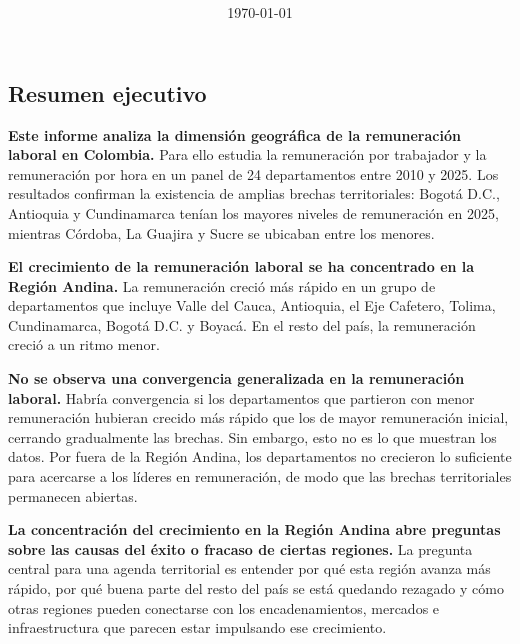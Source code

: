 \documentclass[12pt, a4paper]{article}
\title{\reporttitle\\\reportsubtitle}
\author{\reportauthorone \and \reportauthortwo}
\date{\today}
\begin{document}


\begin{mdframed}[
  linewidth=1pt,
  linecolor=gray!60,
  backgroundcolor=gray!6,
  innertopmargin=12pt,
  innerbottommargin=12pt,
  innerleftmargin=14pt,
  innerrightmargin=14pt
]
\section*{Resumen ejecutivo}

\textbf{Este informe analiza la dimensión geográfica de la remuneración laboral en Colombia.} Para ello estudia la remuneración por trabajador y la remuneración por hora en un panel de 24 departamentos entre 2010 y 2025. Los resultados confirman la existencia de amplias brechas territoriales: Bogotá D.C., Antioquia y Cundinamarca tenían los mayores niveles de remuneración en 2025, mientras Córdoba, La Guajira y Sucre se ubicaban entre los menores.

\textbf{El crecimiento de la remuneración laboral se ha concentrado en la Región Andina.} La remuneración creció más rápido en un grupo de departamentos que incluye Valle del Cauca, Antioquia, el Eje Cafetero, Tolima, Cundinamarca, Bogotá D.C. y Boyacá. En el resto del país, la remuneración creció a un ritmo menor.

\textbf{No se observa una convergencia generalizada en la remuneración laboral.} Habría convergencia si los departamentos que partieron con menor remuneración hubieran crecido más rápido que los de mayor remuneración inicial, cerrando gradualmente las brechas. Sin embargo, esto no es lo que muestran los datos. Por fuera de la Región Andina, los departamentos no crecieron lo suficiente para acercarse a los líderes en remuneración, de modo que las brechas territoriales permanecen abiertas.

\textbf{La concentración del crecimiento en la Región Andina abre preguntas sobre las causas del éxito o fracaso de ciertas regiones.} La pregunta central para una agenda territorial es entender por qué esta región avanza más rápido, por qué buena parte del resto del país se está quedando rezagado y cómo otras regiones pueden conectarse con los encadenamientos, mercados e infraestructura que parecen estar impulsando ese crecimiento.
\end{mdframed}

\newpage
\tableofcontents
\newpage


\end{document}
